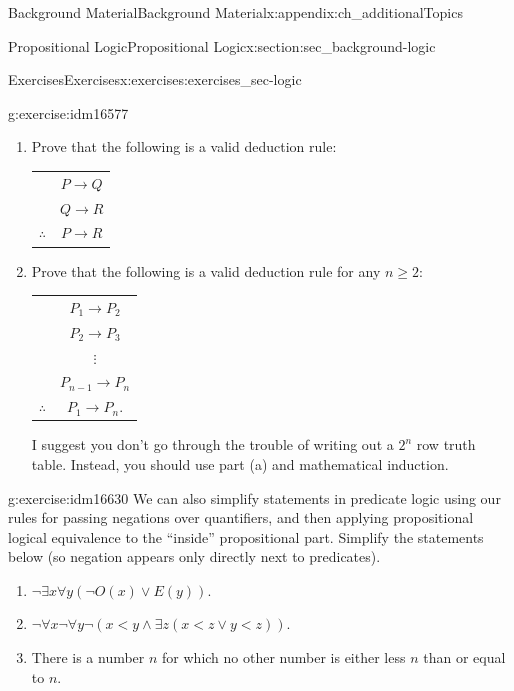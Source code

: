 \documentclass[oneside,10pt,]{book}
\numberwithin{equation}{chapter}
\newcommand{\hrulethin}  {\noalign{\hrule height 0.04em}}
\def\imp{\rightarrow}
\newcommand{\lt}{<}
\begin{document}
\begin{appendixptx}{Background Material}{}{Background Material}{}{}{x:appendix:ch_additionalTopics}
\begin{sectionptx}{Propositional Logic}{}{Propositional Logic}{}{}{x:section:sec_background-logic}
\begin{exercises-subsection}{Exercises}{}{Exercises}{}{}{x:exercises:exercises_sec-logic}
\begin{divisionexercise}{13}{}{}{g:exercise:idm16577}
%
\begin{enumerate}[label=(\alph*)]
\item{}Prove that the following is a valid deduction rule:%
\begin{sidebyside}{1}{0}{0}{0}%
\begin{sbspanel}{1}%
{\centering%
\begin{tabular}{cc}
&\(P \imp Q\)\tabularnewline[0pt]
&\(Q \imp R\)\tabularnewline\hrulethin
\(\therefore\)&\(P \imp R\)
\end{tabular}
\par}
\end{sbspanel}%
\end{sidebyside}%
\item{}Prove that the following is a valid deduction rule for any \(n \ge 2\):%
\begin{sidebyside}{1}{0}{0}{0}%
\begin{sbspanel}{1}%
{\centering%
\begin{tabular}{cc}
&\(P_1 \imp P_2\)\tabularnewline[0pt]
&\(P_2 \imp P_3\)\tabularnewline[0pt]
&\(\vdots\)\tabularnewline[0pt]
&\(P_{n-1} \imp P_n\)\tabularnewline\hrulethin
\(\therefore\)&\(P_1 \imp P_n\).
\end{tabular}
\par}
\end{sbspanel}%
\end{sidebyside}%
\par
I suggest you don't go through the trouble of writing out a \(2^n\) row truth table. Instead, you should use part (a) and mathematical induction. %
\end{enumerate}
%
\end{divisionexercise}%
\begin{divisionexercise}{14}{}{}{g:exercise:idm16630}%
We can also simplify statements in predicate logic using our rules for passing negations over quantifiers, and then applying propositional logical equivalence to the ``inside'' propositional part.  Simplify the statements below (so negation appears only directly next to predicates).%
\par
%
\begin{enumerate}[label=(\alph*)]
\item{}\(\neg \exists x \forall y (\neg O(x) \vee E(y))\).%
\item{}\(\neg \forall x \neg \forall y \neg(x \lt  y \wedge \exists z (x \lt  z \vee y \lt  z))\).%
\item{}There is a number \(n\) for which no other number is either less \(n\) than or equal to \(n\).%

\end{enumerate}
\end{divisionexercise}
\end{exercises-subsection}
\end{sectionptx}
\end{appendixptx}
\end{document}
